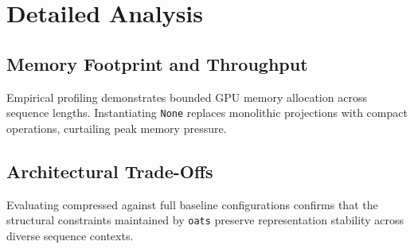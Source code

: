 \section{Detailed Analysis}

\subsection{Memory Footprint and Throughput}
Empirical profiling demonstrates bounded GPU memory allocation across sequence lengths. Instantiating \texttt{None} replaces monolithic projections with compact operations, curtailing peak memory pressure.

\subsection{Architectural Trade-Offs}
Evaluating compressed against full baseline configurations confirms that the structural constraints maintained by \texttt{oats} preserve representation stability across diverse sequence contexts.
